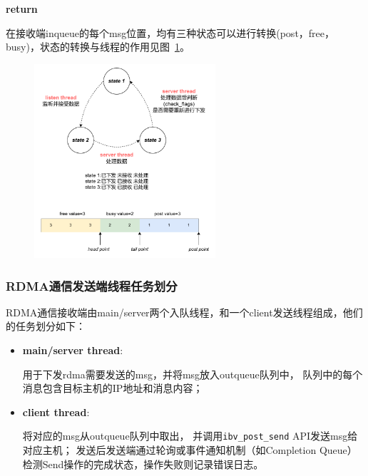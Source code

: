 {\begin{itemize}
\begin{algorithm}
\begin{algorithmic}[1]
                      \State {}
                      \EndIf
                      \EndWhile
                      \State \textbf{return}
                      \EndProcedure
                  \end{algorithmic}
              \end{algorithm}
    \end{itemize}

    在接收端inqueue的每个msg位置，均有三种状态可以进行转换(post，free，busy)，状态的转换与线程的作用见图~\ref{fig:RDMA-recv-state}。
    \begin{figure}[H]
        \centering
        \includegraphics[width=0.6\textwidth]{Img/recv_state.drawio.pdf}
        \label{fig:RDMA-recv-state}
    \end{figure}

    \subsubsection{RDMA通信发送端线程任务划分}
    RDMA通信接收端由main/server两个入队线程，和一个client发送线程组成，他们的任务划分如下：

    \begin{itemize}
        \item \textbf{main/server thread}:

              用于下发rdma需要发送的msg，并将msg放入outqueue队列中，
              队列中的每个消息包含目标主机的IP地址和消息内容；
        \item \textbf{client thread}:

              将对应的msg从outqueue队列中取出，
              并调用\texttt{ibv\_post\_send} API发送msg给对应主机；
              发送后发送端通过轮询或事件通知机制（如Completion Queue）检测Send操作的完成状态，操作失败则记录错误日志。


\end{itemize}}
